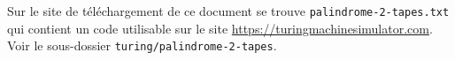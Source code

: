 Sur le site de téléchargement de ce document se trouve \verb+palindrome-2-tapes.txt+ qui contient un code utilisable sur le site \url{https://turingmachinesimulator.com}. Voir le sous-dossier \verb+turing/palindrome-2-tapes+.